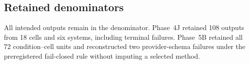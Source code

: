 \subsection{Retained denominators}

All intended outputs remain in the denominator.  Phase~4J retained 108 outputs
from 18 cells and six systems, including terminal failures.  Phase~5B retained
all 72 condition--cell units and reconstructed two provider-schema failures
under the preregistered fail-closed rule without imputing a selected method.
